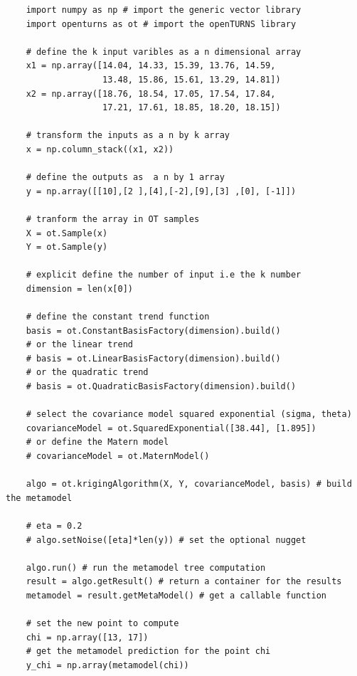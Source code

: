 

\begin{verbatim}
	import numpy as np # import the generic vector library
	import openturns as ot # import the openTURNS library
	
	# define the k input varibles as a n dimensional array
	x1 = np.array([14.04, 14.33, 15.39, 13.76, 14.59,
				   13.48, 15.86, 15.61, 13.29, 14.81])
	x2 = np.array([18.76, 18.54, 17.05, 17.54, 17.84,
	               17.21, 17.61, 18.85, 18.20, 18.15])
	
	# transform the inputs as a n by k array
	x = np.column_stack((x1, x2))
	
	# define the outputs as  a n by 1 array
	y = np.array([[10],[2 ],[4],[-2],[9],[3] ,[0], [-1]])
	
	# tranform the array in OT samples
	X = ot.Sample(x)
	Y = ot.Sample(y)
	
	# explicit define the number of input i.e the k number
	dimension = len(x[0])
	
	# define the constant trend function
	basis = ot.ConstantBasisFactory(dimension).build()
	# or the linear trend
	# basis = ot.LinearBasisFactory(dimension).build()
	# or the quadratic trend
	# basis = ot.QuadraticBasisFactory(dimension).build()
	
	# select the covariance model squared exponential (sigma, theta)
	covarianceModel = ot.SquaredExponential([38.44], [1.895])
	# or define the Matern model
	# covarianceModel = ot.MaternModel()
	
	algo = ot.krigingAlgorithm(X, Y, covarianceModel, basis) # build the metamodel
	
	# eta = 0.2
	# algo.setNoise([eta]*len(y)) # set the optional nugget
	
	algo.run() # run the metamodel tree computation
	result = algo.getResult() # return a container for the results
	metamodel = result.getMetaModel() # get a callable function
	
	# set the new point to compute
	chi = np.array([13, 17])
	# get the metamodel prediction for the point chi
	y_chi = np.array(metamodel(chi))
\end{verbatim}

